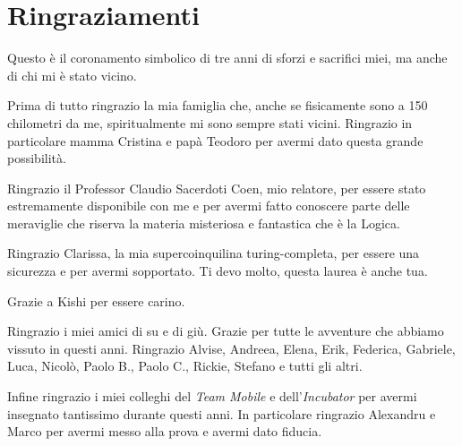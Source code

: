 \documentclass[12pt,a4paper]{mimosis}
\begin{document}
\printbibliography

\chapter*{Ringraziamenti}
Questo è il coronamento simbolico di tre anni di sforzi e sacrifici miei, ma anche di chi mi
è stato vicino.

Prima di tutto ringrazio la mia famiglia che, anche se fisicamente sono a 150 chilometri
da me, spiritualmente mi sono sempre stati vicini.
Ringrazio in particolare mamma Cristina e papà Teodoro per avermi dato questa grande 
possibilità.

Ringrazio il Professor Claudio Sacerdoti Coen, mio relatore, per essere stato estremamente
disponibile con me e per avermi fatto conoscere parte delle meraviglie che riserva la
materia misteriosa e fantastica che è la Logica.

Ringrazio Clarissa, la mia supercoinquilina turing-completa, per essere una
sicurezza e per avermi sopportato. Ti devo molto, questa laurea è anche tua.

Grazie a Kishi per essere carino.

Ringrazio i miei amici di su e di giù. Grazie per tutte le avventure che abbiamo 
vissuto in questi anni. Ringrazio Alvise, Andreea, Elena, Erik,
Federica, Gabriele, Luca, Nicolò, Paolo B., Paolo C., Rickie, Stefano e tutti gli altri.

Infine ringrazio i miei colleghi del \textit{Team Mobile} e dell'\textit{Incubator}
per avermi insegnato tantissimo durante questi anni. In particolare ringrazio Alexandru e Marco per
avermi messo alla prova e avermi dato fiducia.
\end{document}
